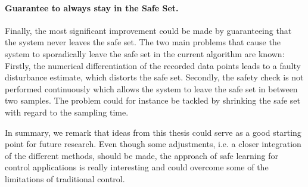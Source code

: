 \documentclass[../main.tex]{subfiles}
\begin{document}
\paragraph{Guarantee to always stay in the Safe Set.} Finally, the most significant improvement could be made by guaranteeing that the system never leaves the safe set. The two main problems that cause the system to sporadically leave the safe set in the current algorithm are known: Firstly, the numerical differentiation of the recorded data points leads to a faulty disturbance estimate, which distorts the safe set. Secondly, the safety check is not performed continuously which allows the system to leave the safe set in between two samples. The problem could for instance be tackled by shrinking the safe set with regard to the sampling time.\par
In summary, we remark that ideas from this thesis could serve as a good starting point for future research. Even though some adjustments, i.e. a closer integration of the different methods, should be made, the approach of safe learning for control applications is really interesting and could overcome some of the limitations of traditional control.
\end{document}
